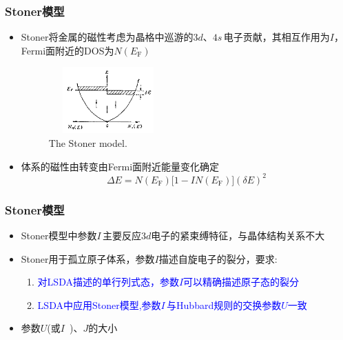 \documentclass[cjk,slidestop,compress,mathserif,blue]{beamer}
\begin{document}
\frame
{
	\frametitle{\textrm{Stoner}模型}
	\begin{itemize}
		\item \textrm{Stoner}将金属的磁性考虑为晶格中巡游的$3d$、$4s$\,电子贡献，其相互作用为$I$，\textrm{Fermi}面附近的\textrm{DOS}为$N(E_{\mathrm F})$
\begin{figure}[h!]
\centering
\vspace*{-0.05in}
\includegraphics[height=1.0in,width=1.8in,viewport=0 0 800 380,clip]{Figures/Mag_Metal-T0.png}
\caption{\tiny \textrm{The Stoner model.}}%
\label{Mag_Metal-T0}
\end{figure}
		\item 体系的磁性由转变由\textrm{Fermi}面附近能量变化确定
			\begin{displaymath}
				\Delta E=N(E_{\mathrm F})\big[1-IN(E_{\mathrm F})\big](\delta E)^2
			\end{displaymath}
	\end{itemize}
}

\frame
{
	\frametitle{\textrm{Stoner}模型}
	\begin{itemize}
		\item \textrm{Stoner}模型中参数$I$\,主要反应$3d$电子的紧束缚特征，与晶体结构关系不大
		\item \textrm{Stoner}用于孤立原子体系，参数$I$描述自旋电子的裂分，要求:
			\begin{enumerate}
				\item \textcolor{blue}{对\textrm{LSDA}描述的单行列式态，参数$I$可以精确描述原子态的裂分}
				\item \textcolor{blue}{\textrm{LSDA}中应用\textrm{Stoner}模型,参数$I$\,与\textrm{Hubbard}规则的交换参数$U$一致}
			\end{enumerate}
		\item 参数$U$(或$I$~)、$J$的大小\\
	\end{itemize}
}
\end{document}
